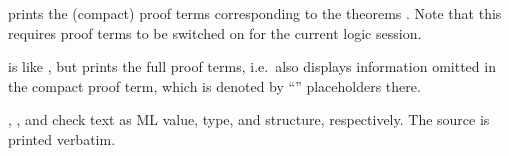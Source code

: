 \begin{isabellebody}
\begin{isamarkuptext}
\begin{description}
  \item {} prints the (compact) proof terms
  corresponding to the theorems . Note that this
  requires proof terms to be switched on for the current logic
  session.
  
  \item {} is like , but prints the full proof terms, i.e.\ also displays
  information omitted in the compact proof term, which is denoted by
  ``'' placeholders there.
  
  \item {}, , and  check text  as ML value, type, and
  structure, respectively.  The source is printed verbatim.


\end{description}
\end{isamarkuptext}
\end{isabellebody}

